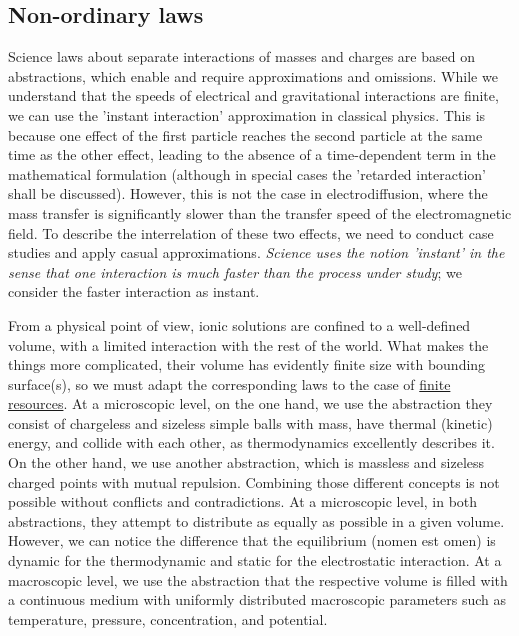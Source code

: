\subsection{Non-ordinary laws\label{sec:Physics-NonOrdinaryLaws}}


Science laws about separate interactions of masses and charges are
based on abstractions, which enable and require approximations and omissions.
While we understand that the speeds of electrical and gravitational
interactions are finite, we can use the 'instant interaction' approximation
in classical physics. This is because one effect of the first particle
reaches the second particle at the same time as the other effect,
leading to the absence of a time-dependent term in the mathematical
formulation (although in special cases the 'retarded interaction' shall be discussed). However, this is not the case in electrodiffusion, where
the mass transfer is significantly slower than the transfer speed
of the electromagnetic field. To describe the interrelation of these
two effects, we need to conduct case studies and apply casual approximations.
\textit{Science uses the notion 'instant' in the sense that one interaction
is much faster than the process under study}; we consider the faster interaction as instant. 


From a physical point of view, \hypertarget{PhysicsLawsOfMotion}{ionic solutions} are confined to a well-defined volume, with a limited interaction with the rest of the world.
What makes the things more complicated, their volume has evidently finite size with bounding surface(s), so we must adapt the corresponding laws to the case of \hyperlink{ChangingResources}
{finite resources}.
At a microscopic level, on the one hand, we use the abstraction they consist of chargeless and sizeless simple balls with mass, have thermal (kinetic) energy, and collide with each other, as thermodynamics excellently describes it.
On the other hand, we use another abstraction, which is massless and sizeless charged points with mutual repulsion. 
Combining those different concepts is not possible without conflicts and contradictions. At a microscopic level, in both abstractions, they attempt to distribute as equally as possible in a given volume. 
However, we can notice the difference that the equilibrium 
(nomen est omen) 
is dynamic for the thermodynamic and static for the electrostatic interaction.
At a macroscopic level, we use the abstraction that the respective volume is filled with a continuous medium with uniformly distributed macroscopic parameters such as temperature, pressure, concentration, and potential. 


